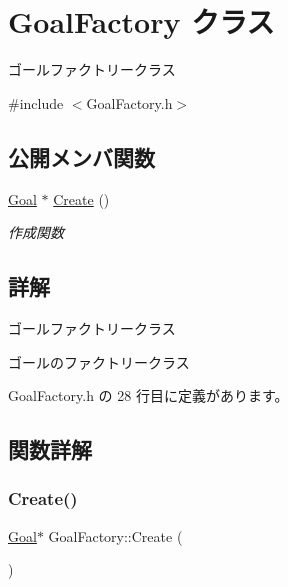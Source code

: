 \hypertarget{class_goal_factory}{}\section{Goal\+Factory クラス}
\label{class_goal_factory}


ゴールファクトリークラス  




{\ttfamily \#include $<$Goal\+Factory.\+h$>$}

\subsection*{公開メンバ関数}
\begin{DoxyCompactItemize}
\item 
\mbox{\hyperlink{class_goal}{Goal}} $\ast$ \mbox{\hyperlink{class_goal_factory_af0b52f5fd6e567a05985285369be7b2e}{Create}} ()
\begin{DoxyCompactList}\small\item\em 作成関数 \end{DoxyCompactList}\end{DoxyCompactItemize}


\subsection{詳解}
ゴールファクトリークラス 

ゴールのファクトリークラス 

 Goal\+Factory.\+h の 28 行目に定義があります。



\subsection{関数詳解}
\mbox{\label{class_goal_factory_af0b52f5fd6e567a05985285369be7b2e}} 
\subsubsection{\texorpdfstring{Create()}{Create()}}
{\footnotesize\ttfamily \mbox{\hyperlink{class_goal}{Goal}}$\ast$ Goal\+Factory\+::\+Create (\begin{DoxyParamCaption}{ }\end{DoxyParamCaption})\hspace{0.3cm}{\ttfamily [inline]}}



